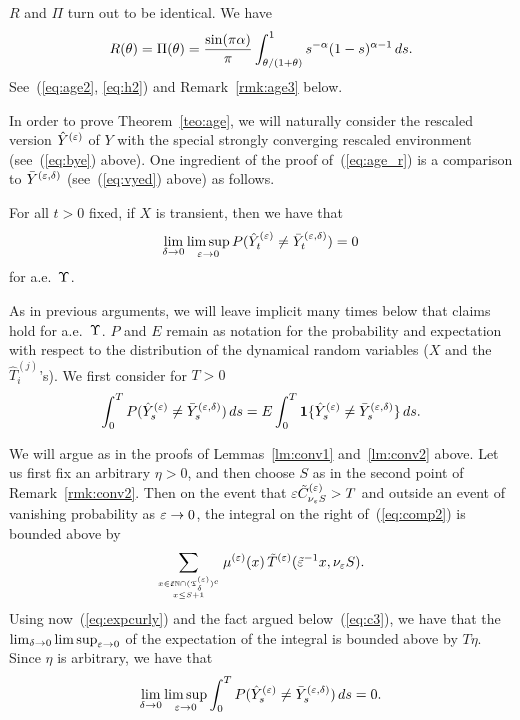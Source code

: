 \begin{rmk}
\label{rmk:age2}
$R$ and $\Pi$ turn out to be identical. We have
\begin{equation}
\label{eq:pir} 
R(\theta)=\Pi(\theta)=\frac{\sin(\pi\alpha)}{\pi}\int_{\theta/(1+\theta)}^1s^{-\a}(1-s)^{\a-1}\,ds.
\end{equation}
See~(\ref{eq:age2}, \ref{eq:h2}) and Remark~\ref{rmk:age3} below. 
\end{rmk}



In order to prove Theorem~\ref{teo:age}, we will naturally consider the rescaled version $\hat Y^{(\varepsilon)}$ of $Y$ with the special strongly converging rescaled
environment (see~(\ref{eq:bye}) above). One ingredient of the proof of~(\ref{eq:age_r}) is a comparison to $\bar Y^{(\varepsilon,\delta)}$ (see~(\ref{eq:vyed}) above) as
follows.


\begin{lm}
\label{lm:comp}
For all $t>0$ fixed, if $X$ is transient, then we have that
\begin{equation}
\label{eq:comp1}
\lim_{\delta\to0}\limsup_{\eps\to0}P(\hye_t\ne\vyed_t)=0
\end{equation}
for a.e.~$\Upsilon$.
\end{lm}


As in previous arguments, we will leave implicit many times below that claims hold for a.e.~$\Upsilon$.
$P$ and $E$ remain as notation for the probability and expectation with respect to the distribution
of the dynamical random variables ($X$ and the $\hat T_i^{(j)}$'s).
We first consider for $T>0$
\begin{equation}
\label{eq:comp2}
\int_0^TP(\hye_s\ne\vyed_s)\,ds=E\int_0^T\1\{\hye_s\ne\vyed_s\}\,ds.
\end{equation}

We will argue as in the proofs of Lemmas~\ref{lm:conv1} and~\ref{lm:conv2} above. Let us first fix an arbitrary $\eta>0$, and then choose 
$S$ as in the second point of Remark~\ref{rmk:conv2}. Then on the event that $\varepsilon\tilde C^{(\varepsilon)}_{\nu_\varepsilon S}>T$ and outside an event of vanishing 
probability as $\varepsilon\to0$, the integral on the right of~(\ref{eq:comp2}) is bounded above by
\begin{equation}
\label{eq:comp3}
\sum_{x\in\te\N\cap(\teps_\delta)^c\atop x\leq S+1}\mue(x) \,\bte(\te^{-1}x,\nu_\eps S).
\end{equation}
Using now~(\ref{eq:expcurly}) and the fact argued below~(\ref{eq:c3}), we have that the $\lim_{\delta\to0}\limsup_{\varepsilon\to0}$
of the expectation of the integral is bounded above by $T\eta$. Since $\eta$ is arbitrary, we have that
\begin{equation}
\label{eq:comp4}
\lim_{\delta\to0}\limsup_{\eps\to0}\int_0^TP(\hye_s\ne\vyed_s)\,ds=0.
\end{equation}

